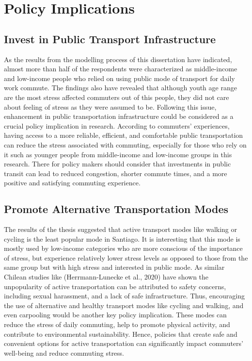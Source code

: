 \documentclass[
11pt, %
oneside, %
english, %
singlespacing, %
]{macthesis} %
\begin{document}
\hypertarget{policy-implications}{%
\section{Policy Implications}\label{policy-implications}}

\hypertarget{invest-in-public-transport-infrastructure}{%
\subsection{Invest in Public Transport Infrastructure}\label{invest-in-public-transport-infrastructure}}

As the results from the modelling process of this dissertation have indicated, almost more than half of the respondents were characterized as middle-income and low-income people who relied on using public mode of transport for daily work commute. The findings also have revealed that although youth age range are the most stress affected commuters out of this people, they did not care about feeling of stress as they were assumed to be. Following this issue, enhancement in public transportation infrastructure could be considered as a crucial policy implication in research. According to commuters' experiences, having access to a more reliable, efficient, and comfortable public transportation can reduce the stress associated with commuting, especially for those who rely on it such as younger people from middle-income and low-income groups in this research. There for policy makers should consider that investments in public transit can lead to reduced congestion, shorter commute times, and a more positive and satisfying commuting experience.

\hypertarget{promote-alternative-transportation-modes}{%
\subsection{Promote Alternative Transportation Modes}\label{promote-alternative-transportation-modes}}

The results of the thesis suggested that active transport modes like walking or cycling is the least popular mode in Santiago. It is interesting that this mode is mostly used by low-income categories who are more conscious of the importance of stress, but experience relatively lower stress levels as opposed to those from the same group but with high stress and interested in public mode. As similar Chilean studies like (Herrmann-Lunecke et al., 2020) have shown the unpopularity of active transportation can be attributed to safety concerns, including sexual harassment, and a lack of safe infrastructure. Thus, encouraging the use of alternative and healthy transport modes like cycling and walking, and even carpooling would be another key policy implication. These modes can reduce the stress of daily commuting, help to promote physical activity, and contribute to environmental sustainability. Hence, policies that create safe and convenient options for active transportation can significantly impact commuters' well-being and reduce commuting stress.
\end{document}
